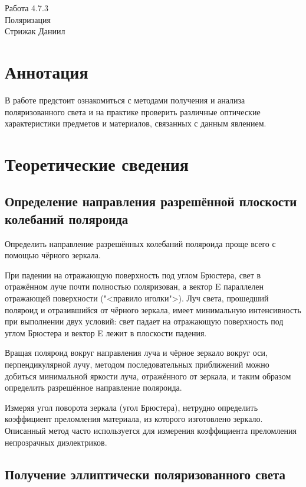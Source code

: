 



\begin{center}
  \LARGE{Работа 4.7.3}\\[0.2cm]
  \LARGE{Поляризация}\\[0.2cm]
  \large{Стрижак Даниил}\\[0.2cm]
\end{center}  
  

\section{Аннотация}
	В работе предстоит ознакомиться с методами получения и анализа поляризованного света и на практике проверить различные оптические характеристики предметов и материалов, связанных с данным явлением.
	
\section{Теоретические сведения}

\subsection{Определение направления разрешённой плоскости колебаний поляроида}
	
	Определить направление разрешённых колебаний поляроида проще всего с помощью чёрного зеркала.
	
При падении на отражающую поверхность под углом Брюстера, свет в отражённом луче почти полностью поляризован, а вектор E параллелен отражающей поверхности ("<правило иголки">). Луч света, прошедший поляроид и отразившийся от чёрного зеркала, имеет минимальную интенсивность при выполнении двух условий: свет падает на отражающую поверхность под углом Брюстера и вектор E лежит в плоскости падения.

Вращая поляроид вокруг направления луча и чёрное зеркало вокруг оси, перпендикулярной лучу, методом последовательных приближений можно добиться минимальной яркости луча, отражённого от зеркала, и таким образом определить разрешённое направление поляроида.

Измеряя угол поворота зеркала (угол Брюстера), нетрудно определить коэффициент преломления материала, из которого изготовлено зеркало. Описанный метод часто используется для измерения коэффициента преломления непрозрачных диэлектриков.

\subsection{Получение эллиптически поляризованного света}


